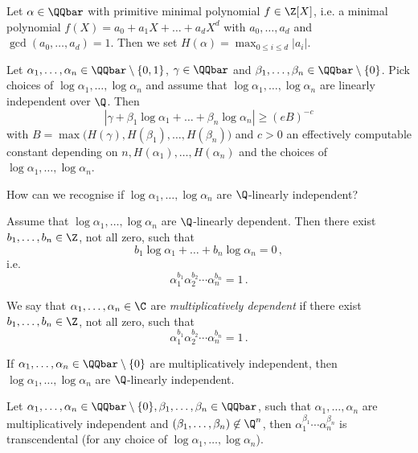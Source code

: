 \begin{defn*}[Height]
	Let \( \alpha \in \QQbar \) with primitive minimal polynomial \( f \in \Z[X] \), i.e. a minimal polynomial \( f(X) = a_0 + a_1X + \dots + a_dX^d \) with \( a_0, \dotsc, a_d \) and \( \gcd(a_0, \dotsc, a_d) = 1 \).
	Then we set \( H(\alpha) = \max_{0 \leq i \leq d} |a_i| \).
\end{defn*}

\begin{thmn}
	Let \( \alpha_1, \dotsc, \alpha_n \in \QQbar \setminus \{0,1\} \), \( \gamma \in \QQbar \) and \( \beta_1, \dotsc, \beta_n \in \QQbar \setminus \{0\} \).
	Pick choices of \( \log\alpha_1, \dotsc, \log\alpha_n \) and assume that \( \log\alpha_1, \dotsc, \log\alpha_n \) are linearly independent over \( \Q \).
	Then 
	\[ \left| \gamma + \beta_1 \log\alpha_1 + \dots + \beta_n \log\alpha_n \right| \geq (eB)^{-c} \]
	with \( B = \max \big( H(\gamma), H(\beta_1), \dotsc, H(\beta_n) \big) \) and \( c>0 \) an effectively computable constant depending on \( n, H(\alpha_1), \dotsc, H(\alpha_n) \) and the choices of \( \log\alpha_1, \dotsc, \log\alpha_n \).
\end{thmn}

\begin{frage*}
	How can we recognise if \( \log\alpha_1, \dotsc, \log\alpha_n \) are \( \Q \)-linearly independent?
\end{frage*}

Assume that \( \log\alpha_1, \dotsc, \log\alpha_n \) are \( \Q \)-linearly dependent.
Then there exist \( b_1, \dotsc, b_n \in \Z \), not all zero, such that
\[ b_1 \log\alpha_1 + \dots + b_n \log\alpha_n = 0 \,, \]
i.e.
\[ \alpha_1^{b_1} \alpha_2^{b_2} \dotsm \alpha_n^{b_n} = 1 \,. \]

\begin{defn*}
	We say that \( \alpha_1, \dotsc, \alpha_n \in \C \) are \emph{multiplicatively dependent} if there exist \( b_1, \dotsc, b_n \in \Z \), not all zero, such that
	\[ \alpha_1^{b_1} \alpha_2^{b_2} \dotsm \alpha_n^{b_n} = 1 \,. \]
\end{defn*}

\begin{rem*}
	If \( \alpha_1, \dotsc, \alpha_n \in \QQbar \setminus \{0\} \) are multiplicatively independent, then \( \log\alpha_1, \dotsc, \log\alpha_n \) are \( \Q \)-linearly independent.
\end{rem*}

\begin{cor}
	Let \( \alpha_1, \dotsc, \alpha_n \in \QQbar \setminus \{0\}, \beta_1, \dotsc, \beta_n \in \QQbar \), such that \( \alpha_1, \dotsc, \alpha_n \) are multiplicatively independent and \( (\beta_1, \dotsc, \beta_n) \not\in \Q^n \), then \( \alpha_1^{\beta_1} \dotsm \alpha_n^{\beta_n} \) is transcendental (for any choice of \( \log\alpha_1, \dotsc, \log\alpha_n \)).
\end{cor}